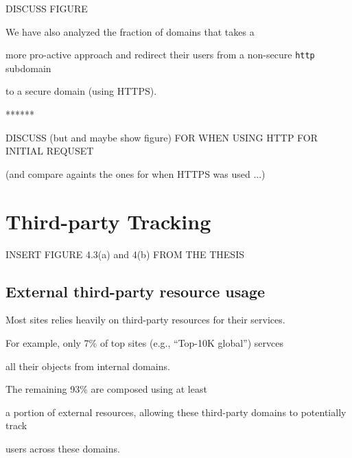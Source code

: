 \documentclass{sig-alternate-10pt}
\begin{document}
DISCUSS FIGURE



We have also analyzed the fraction of domains that takes a 

more pro-active approach and redirect their users from a non-secure \texttt{http} subdomain

to a secure domain (using HTTPS).   

******

DISCUSS (but and maybe show figure) FOR WHEN USING HTTP FOR INITIAL REQUSET

(and compare againts the ones for when HTTPS was used ...)







\section{Third-party Tracking}\label{sec:tracking}



INSERT FIGURE 4.3(a) and 4(b) FROM THE THESIS



\subsection{External third-party resource usage}



Most sites relies heavily on third-party resources for their services.

For example, only 7\% of top sites (e.g., ``Top-10K global'') servces 

all their objects from internal domains.

The remaining 93\% are composed using at least

a portion of external resources, allowing these third-party domains to potentially track

users across these domains.



\end{document}
